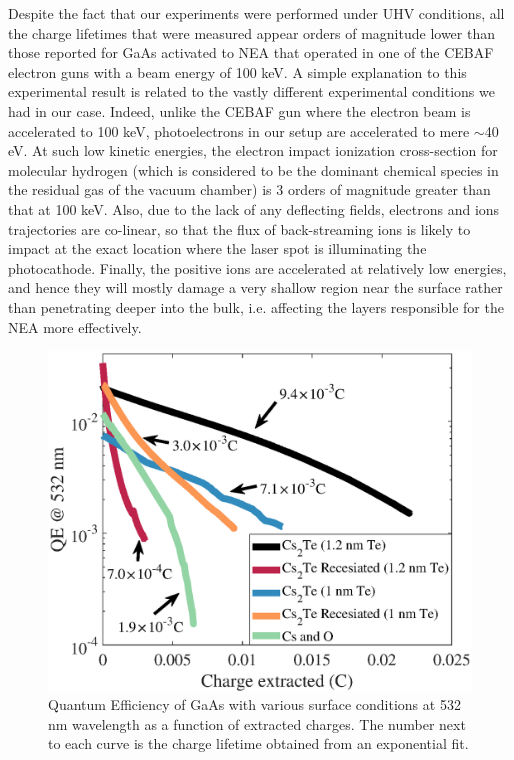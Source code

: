 Despite the fact that our experiments were performed under UHV conditions, all the charge lifetimes that were measured appear orders of magnitude lower than those reported for GaAs activated to NEA that operated in one of the CEBAF electron guns with a beam energy of 100 keV.\cite{sinclair2007_DevelopmentHighAverage} A simple explanation to this experimental result is related to the vastly different experimental conditions we had in our case. Indeed, unlike the CEBAF gun where the electron beam is accelerated to 100 keV, photoelectrons in our setup are accelerated to mere $\sim$40 eV. At such low kinetic energies, the electron impact ionization cross-section for molecular hydrogen (which is considered to be the dominant chemical species in the residual gas of the vacuum chamber) is 3 orders of magnitude greater than that at 100 keV.\cite{grames2011_ChargeFluenceLifetime,sinclair2007_DevelopmentHighAverage} Also, due to the lack of any deflecting fields, electrons and ions trajectories are co-linear, so that the flux of back-streaming ions is likely to impact at the exact location where the laser spot is illuminating the photocathode. Finally, the positive ions are accelerated at relatively low energies, and hence they will mostly damage a very shallow region near the surface rather than penetrating deeper into the bulk, i.e. affecting the layers responsible for the NEA more effectively.
\begin{figure}
    \centering
    \includegraphics[scale=0.53]{figs/CsTe/lifetime.eps}
    \caption{Quantum Efficiency of GaAs with various surface conditions at 532 nm wavelength as a function of extracted charges. The number next to each curve is the charge lifetime obtained from an exponential fit.
    }
    \label{lifetime}
\end{figure}

